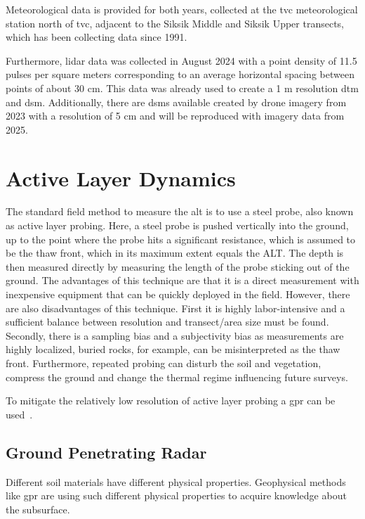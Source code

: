 Meteorological data is provided for both years, collected at the \gls{tvc} meteorological station north of \gls{tvc}, adjacent to the Siksik Middle and Siksik Upper transects, which has been collecting data since 1991. 

Furthermore, lidar data was collected in August 2024 with a point density of 11.5 pulses per square meters corresponding to an average horizontal spacing between points of about 30 cm. 
This data was already used to create a 1 m resolution \gls{dtm} and \gls{dsm}. 
Additionally, there are \glspl{dsm} available created by drone imagery from 2023 with a resolution of 5 cm and will be reproduced with imagery data from 2025.

\section{Active Layer Dynamics}
The standard field method to measure the \gls{alt} is to use a steel probe, also known as active layer probing. 
Here, a steel probe is pushed vertically into the ground, up to the point where the probe hits a significant resistance, which is assumed to be the thaw front, which in its maximum extent equals the ALT.\@
The depth is then measured directly by measuring the length of the probe sticking out of the ground. 
The advantages of this technique are that it is a direct measurement with inexpensive equipment that can be quickly deployed in the field. 
However, there are also disadvantages of this technique. First it is highly labor-intensive and a sufficient balance between resolution and transect/area size must be found. 
Secondly, there is a sampling bias and a subjectivity bias as measurements are highly localized, buried rocks, for example, can be misinterpreted as the thaw front. 
Furthermore, repeated probing can disturb the soil and vegetation, compress the ground and change the thermal regime influencing future surveys.

To mitigate the relatively low resolution of active layer probing a \gls{gpr} can be used~\citep{angelopoulosApplicationCCRGPR2013,guoDetectionPermafrostSubgrade2015,harrisUsingGroundPenetratingRadar2025,hinkelDetectionSubsurfacePermafrost2001,koyanPotential3DGPR2025,moormanImagingNearsurfacePermafrost2007,sudakovaUsingGroundPenetrating2021,sudakovaGroundPenetratingRadarStudies2019}.
\subsection{Ground Penetrating Radar}
Different soil materials have different physical properties. 
Geophysical methods like \gls{gpr} are using such different physical properties to acquire knowledge about the subsurface.

